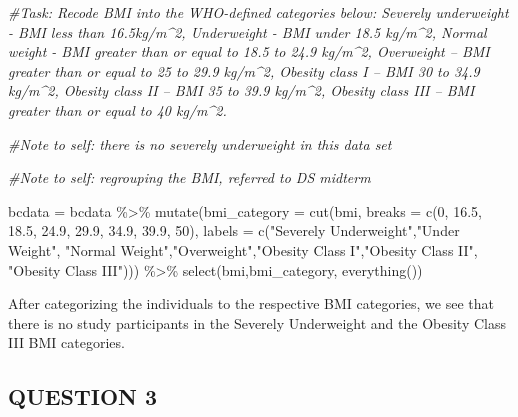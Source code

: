 \documentclass[
]{article}
\newenvironment{Shaded}{\begin{snugshade}}{\end{snugshade}}
\newcommand{\AttributeTok}[1]{\textcolor[rgb]{0.77,0.63,0.00}{#1}}
\newcommand{\CommentTok}[1]{\textcolor[rgb]{0.56,0.35,0.01}{\textit{#1}}}
\newcommand{\DecValTok}[1]{\textcolor[rgb]{0.00,0.00,0.81}{#1}}
\newcommand{\FloatTok}[1]{\textcolor[rgb]{0.00,0.00,0.81}{#1}}
\newcommand{\FunctionTok}[1]{\textcolor[rgb]{0.00,0.00,0.00}{#1}}
\newcommand{\NormalTok}[1]{#1}
\newcommand{\OtherTok}[1]{\textcolor[rgb]{0.56,0.35,0.01}{#1}}
\newcommand{\SpecialCharTok}[1]{\textcolor[rgb]{0.00,0.00,0.00}{#1}}
\newcommand{\StringTok}[1]{\textcolor[rgb]{0.31,0.60,0.02}{#1}}
\begin{document}
\begin{Shaded}
\begin{Highlighting}[]
\CommentTok{\#Task: Recode BMI into the WHO{-}defined categories below: Severely underweight {-} BMI less than 16.5kg/m\^{}2, Underweight {-} BMI under 18.5 kg/m\^{}2, Normal weight {-} BMI greater than or equal to 18.5 to 24.9 kg/m\^{}2, Overweight – BMI greater than or equal to 25 to 29.9 kg/m\^{}2, Obesity class I – BMI 30 to 34.9 kg/m\^{}2, Obesity class II – BMI 35 to 39.9 kg/m\^{}2, Obesity class III – BMI greater than or equal to 40 kg/m\^{}2. }

\CommentTok{\#Note to self: there is no severely underweight in this data set}
 
\CommentTok{\#Note to self: regrouping the BMI, referred to DS midterm}

\NormalTok{bcdata }\OtherTok{=}\NormalTok{ bcdata }\SpecialCharTok{\%\textgreater{}\%}  
  \FunctionTok{mutate}\NormalTok{(}\AttributeTok{bmi\_category =} \FunctionTok{cut}\NormalTok{(bmi, }\AttributeTok{breaks =} \FunctionTok{c}\NormalTok{(}\DecValTok{0}\NormalTok{, }\FloatTok{16.5}\NormalTok{, }\FloatTok{18.5}\NormalTok{, }\FloatTok{24.9}\NormalTok{, }\FloatTok{29.9}\NormalTok{, }\FloatTok{34.9}\NormalTok{, }\FloatTok{39.9}\NormalTok{, }\DecValTok{50}\NormalTok{), }\AttributeTok{labels =} \FunctionTok{c}\NormalTok{(}\StringTok{"Severely Underweight"}\NormalTok{,}\StringTok{"Under Weight"}\NormalTok{, }\StringTok{"Normal Weight"}\NormalTok{,}\StringTok{"Overweight"}\NormalTok{,}\StringTok{"Obesity Class  I"}\NormalTok{,}\StringTok{"Obesity Class II"}\NormalTok{, }\StringTok{"Obesity Class III"}\NormalTok{))) }\SpecialCharTok{\%\textgreater{}\%}  
  \FunctionTok{select}\NormalTok{(bmi,bmi\_category, }\FunctionTok{everything}\NormalTok{()) }
\end{Highlighting}
\end{Shaded}

After categorizing the individuals to the respective BMI categories, we
see that there is no study participants in the Severely Underweight and
the Obesity Class III BMI categories.

\hypertarget{question-3}{%
\subsection{QUESTION 3}\label{question-3}}
\end{document}
